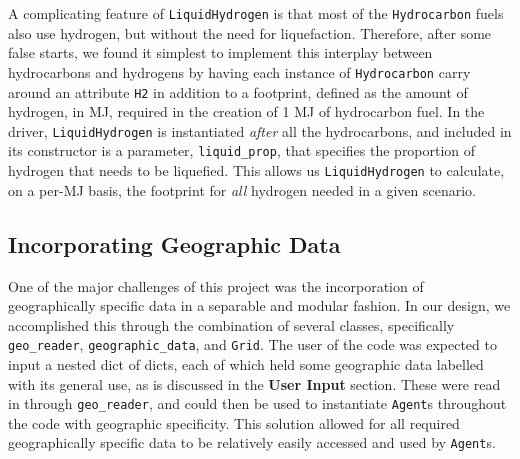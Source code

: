 \documentclass{article}
\begin{document}
A complicating feature of \texttt{LiquidHydrogen} is that most of the \texttt{Hydrocarbon} fuels also use hydrogen, but without the need for liquefaction. Therefore, after some false starts, we found it simplest to implement this interplay between hydrocarbons and hydrogens by having each instance of \texttt{Hydrocarbon} carry around an attribute \texttt{H2} in addition to a footprint, defined as the amount of hydrogen, in MJ, required in the creation of 1 MJ of hydrocarbon fuel. In the driver, \texttt{LiquidHydrogen} is instantiated \textit{after} all the hydrocarbons, and included in its constructor is a parameter, \texttt{liquid\_prop}, that specifies the proportion of hydrogen that needs to be liquefied. This allows us \texttt{LiquidHydrogen} to calculate, on a per-MJ basis, the footprint for \textit{all} hydrogen needed in a given scenario.

\subsection*{Incorporating Geographic Data}
One of the major challenges of this project was the incorporation of geographically specific data in a separable and modular fashion. In our design, we accomplished this through the combination of several classes, specifically \texttt{geo\_reader}, \texttt{geographic\_data}, and \texttt{Grid}. The user of the code was expected to input a nested dict of dicts, each of which held some geographic data labelled with its general use, as is discussed in the \textbf{User Input} section. These were read in through \texttt{geo\_reader}, and could then be used to instantiate \texttt{Agent}s throughout the code with geographic specificity. This solution allowed for all required geographically specific data to be relatively easily accessed and used by \texttt{Agent}s.  
\end{document}
